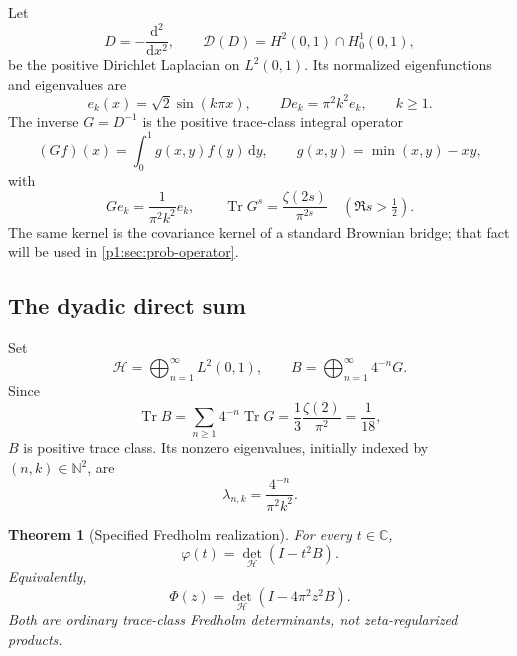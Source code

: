 \documentclass[11pt,oneside]{article}
\newtheorem{theorem}{Theorem}[section]
\theoremstyle{definition}
\newcommand{\dd}{\,\mathrm d}
\newcommand{\C}{\mathbb C}
\newcommand{\N}{\mathbb N}
\newcommand{\Tr}{\operatorname{Tr}}
\newcommand{\PhiF}{\Phi}
\newcommand{\phiF}{\varphi}
\begin{document}
Let
\begin{equation}
 D=-\frac{\mathrm d^2}{\mathrm dx^2},
 \qquad
 \mathcal D(D)=H^2(0,1)\cap H_0^1(0,1),
 \label{p1:eq:Dirichlet-D}
\end{equation}
be the positive Dirichlet Laplacian on \(L^2(0,1)\).  Its normalized eigenfunctions and
eigenvalues are
\begin{equation}
 e_k(x)=\sqrt2\sin(k\pi x),
 \qquad
 De_k=\pi^2k^2e_k,
 \qquad k\ge1.
 \label{p1:eq:D-spectrum}
\end{equation}
The inverse \(G=D^{-1}\) is the positive trace-class integral operator
\begin{equation}
 (Gf)(x)=\int_0^1g(x,y)f(y)\dd y,
 \qquad
 g(x,y)=\min(x,y)-xy,
 \label{p1:eq:Green-kernel}
\end{equation}
with
\begin{equation}
 Ge_k=\frac1{\pi^2k^2}e_k,
 \qquad
 \Tr G^s=\frac{\zeta(2s)}{\pi^{2s}}
 \quad(\Re s>\tfrac12).
 \label{p1:eq:G-zeta}
\end{equation}
The same kernel is the covariance kernel of a standard Brownian bridge; that fact will
be used in \cref{p1:sec:prob-operator}.

\subsection{The dyadic direct sum}

Set
\begin{equation}
 \mathscr H=\bigoplus_{n=1}^{\infty}L^2(0,1),
 \qquad
 B=\bigoplus_{n=1}^{\infty}4^{-n}G.
 \label{p1:eq:B-definition}
\end{equation}
Since
\begin{equation}
 \Tr B=\sum_{n\ge1}4^{-n}\Tr G
 =\frac13\frac{\zeta(2)}{\pi^2}=\frac1{18},
 \label{p1:eq:B-trace}
\end{equation}
\(B\) is positive trace class.  Its nonzero eigenvalues, initially indexed by
\((n,k)\in\N^2\), are
\begin{equation}
 \lambda_{n,k}=\frac{4^{-n}}{\pi^2k^2}.
 \label{p1:eq:B-double-spectrum}
\end{equation}

\begin{theorem}[Specified Fredholm realization]
\label{p1:thm:Fredholm}
For every \(t\in\C\),
\begin{equation}
 \boxed{\quad
 \phiF(t)=\det_{\mathscr H}(I-t^2B).
 \quad}
 \label{p1:eq:Fredholm-phi}
\end{equation}
Equivalently,
\begin{equation}
 \PhiF(z)=\det_{\mathscr H}(I-4\pi^2z^2B).
 \label{p1:eq:Fredholm-Phi}
\end{equation}
Both are ordinary trace-class Fredholm determinants, not zeta-regularized products.
\end{theorem}
\end{document}
